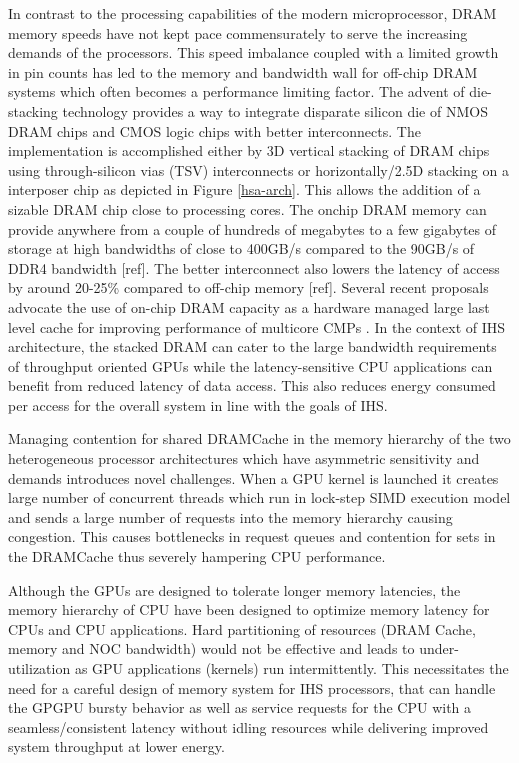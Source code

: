 \par In contrast to the processing capabilities of the modern microprocessor, DRAM memory speeds have not kept pace commensurately to serve the increasing demands of the processors. This speed imbalance coupled with a limited growth in pin counts has led to the memory and bandwidth wall \cite{memory-wall,bandwidth-wall} for off-chip DRAM systems which often becomes a performance limiting factor. The advent of die-stacking technology \cite{3d-stacking} provides a way to integrate disparate silicon die of NMOS DRAM chips and CMOS logic chips with better interconnects. The implementation is accomplished either by 3D vertical stacking of DRAM chips using through-silicon vias (TSV) interconnects or horizontally/2.5D stacking on a interposer chip as depicted in Figure \ref{hsa-arch}. This allows the addition of a sizable DRAM chip close to processing cores. The onchip DRAM memory can provide anywhere from a couple of hundreds of megabytes to a few gigabytes of storage at high bandwidths of close to 400GB/s compared to the 90GB/s of DDR4 bandwidth [ref]. The better interconnect also lowers the latency of access by around 20-25\% compared to off-chip memory [ref]. Several recent proposals advocate the use of on-chip DRAM capacity as a hardware managed large last level cache for improving performance of multicore CMPs \cite{alloy,bimodal,loh-hill,atcache}. In the context of IHS architecture, the stacked DRAM can cater to the large bandwidth requirements of throughput oriented GPUs while the latency-sensitive CPU applications can benefit from reduced latency of data access. This also reduces energy consumed per access for the overall system in line with the goals of IHS.
\par Managing contention for shared DRAMCache in the memory hierarchy of the two heterogeneous processor architectures which have asymmetric sensitivity and demands introduces novel challenges. When a GPU kernel is launched it creates large number of concurrent threads which run in lock-step SIMD execution model and sends a large number of requests into the memory hierarchy causing congestion. This causes bottlenecks in request queues and contention for sets in the DRAMCache thus severely hampering CPU performance. 

Although the GPUs are designed to tolerate longer memory latencies, the memory hierarchy of CPU have been designed to optimize memory latency for CPUs and CPU applications.
Hard partitioning of resources (DRAM Cache, memory and NOC bandwidth) would not be effective and leads to under-utilization as GPU applications (kernels) run intermittently. 
This necessitates the need for a careful design of memory system for IHS processors, that can handle the GPGPU bursty behavior as well as service requests for the CPU with a seamless/consistent latency without idling resources while delivering improved system throughput at lower energy.

